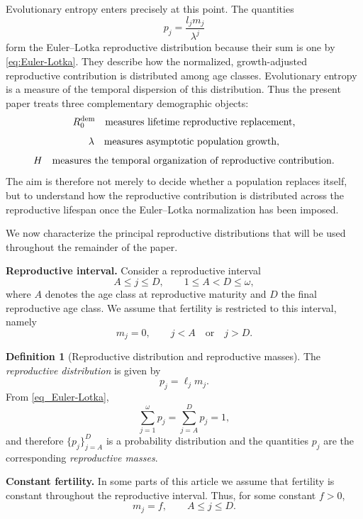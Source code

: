 \documentclass[10pt,a4paper]{amsart}
\theoremstyle{definition}
\newtheorem{defn}[thm]{Definition}
\theoremstyle{remark}
\numberwithin{equation}{section}
\begin{document}
Evolutionary entropy enters precisely at this point. The quantities
\begin{equation}
\label{eq:growth_adjusted_reproductive_contributions}
p_j=\frac{l_jm_j}{\lambda^j}
\end{equation}
form the Euler--Lotka reproductive distribution because their sum is one by \eqref{eq:Euler-Lotka}. They describe how the normalized, growth-adjusted reproductive contribution is distributed among age classes. Evolutionary entropy is a measure of the temporal dispersion of this distribution. Thus the present paper treats three complementary demographic objects:
\[
R_0^{\rm dem}
\quad\hbox{measures lifetime reproductive replacement,}
\]
\[
\lambda
\quad\hbox{measures asymptotic population growth,}
\]
\[
H
\quad\hbox{measures the temporal organization of reproductive contribution.}
\]
The aim is therefore not merely to decide whether a population replaces itself, but to understand how the reproductive contribution is distributed across the reproductive lifespan once the Euler--Lotka normalization has been imposed.

We now characterize the principal reproductive distributions
that will be used throughout the remainder of the paper.

\medskip

\noindent
\textbf{Reproductive interval.}
Consider a reproductive interval
\[
A\le j\le D,
\qquad
1\le A<D\le\omega,
\]
where \(A\) denotes the age class at reproductive maturity
and \(D\) the final reproductive age class. We assume that
fertility is restricted to this interval, namely
\[
m_j=0,
\qquad
j<A
\quad\text{or}\quad
j>D.
\]

\begin{defn}[Reproductive distribution and reproductive masses]
\label{repdist}
The {\em reproductive distribution} is given by
\[
p_j=\ell_jm_j.
\]
From \eqref{eq_Euler-Lotka},
\[
\sum_{j=1}^{\omega}p_j
=
\sum_{j=A}^{D}p_j
=
1,
\]
and therefore \(\{p_j\}_{j=A}^{D}\) is a probability
distribution and the quantities \(p_j\) are the
corresponding {\em reproductive masses}.
\end{defn}

\medskip

\noindent
\textbf{Constant fertility.}
In some parts of this article we assume that fertility is
constant throughout the reproductive interval. Thus,
for some constant \(f>0\),
\begin{equation}
\label{eq_fertility}
m_j=f,
\qquad
A\le j\le D.
\end{equation}
\end{document}
